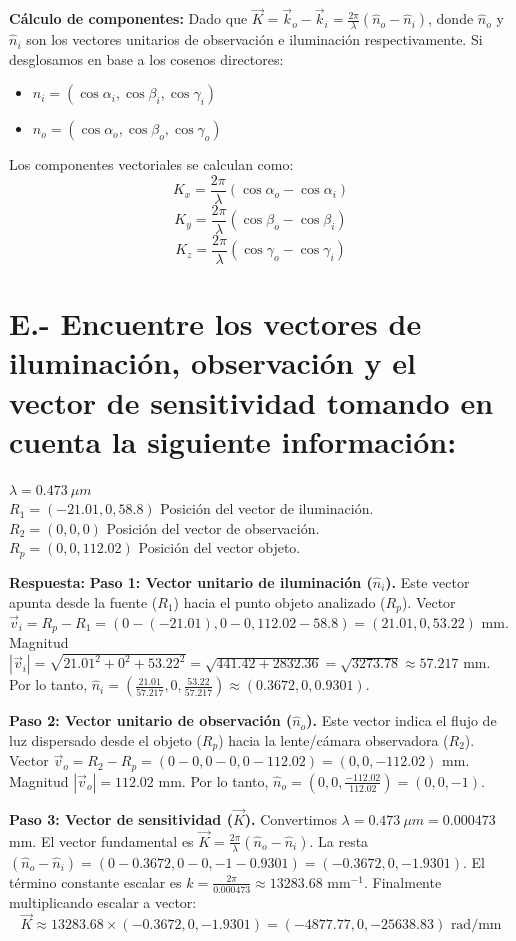 \documentclass[12pt,letterpaper]{article}
\begin{document}
	\textbf{Cálculo de componentes:}
	Dado que $\vec{K} = \vec{k}_o - \vec{k}_i = \frac{2\pi}{\lambda}(\hat{n}_o - \hat{n}_i)$, donde $\hat{n}_o$ y $\hat{n}_i$ son los vectores unitarios de observación e iluminación respectivamente. Si desglosamos en base a los cosenos directores:
	\begin{itemize}
		\item $\hat{n}_i = (\cos\alpha_i, \cos\beta_i, \cos\gamma_i)$
		\item $\hat{n}_o = (\cos\alpha_o, \cos\beta_o, \cos\gamma_o)$
	\end{itemize}
	Los componentes vectoriales se calculan como:
	\[
	K_x = \frac{2\pi}{\lambda} (\cos\alpha_o - \cos\alpha_i)
	\]
	\[
	K_y = \frac{2\pi}{\lambda} (\cos\beta_o - \cos\beta_i)
	\]
	\[
	K_z = \frac{2\pi}{\lambda} (\cos\gamma_o - \cos\gamma_i)
	\]
	
	\newpage
	\section*{E.- Encuentre los vectores de iluminación, observación y el vector de sensitividad tomando en cuenta la siguiente información:}
		$\lambda = 0.473~\mu m$\\
		$R_1 = (-21.01, 0, 58.8)$ Posición del vector de iluminación.\\
		$R_2 = (0, 0, 0)$ Posición del vector de observación.\\
		$R_p = (0, 0, 112.02)$ Posición del vector objeto.
	
	\textbf{Respuesta:}
	\textbf{Paso 1: Vector unitario de iluminación ($\hat{n}_i$).}
	Este vector apunta desde la fuente ($R_1$) hacia el punto objeto analizado ($R_p$).
	Vector $\vec{v}_i = R_p - R_1 = (0 - (-21.01), 0 - 0, 112.02 - 58.8) = (21.01, 0, 53.22)$ mm.
	Magnitud $|\vec{v}_i| = \sqrt{21.01^2 + 0^2 + 53.22^2} = \sqrt{441.42 + 2832.36} = \sqrt{3273.78} \approx 57.217$ mm.
	Por lo tanto, $\hat{n}_i = \left(\frac{21.01}{57.217}, 0, \frac{53.22}{57.217}\right) \approx (0.3672, 0, 0.9301)$.
	
	\textbf{Paso 2: Vector unitario de observación ($\hat{n}_o$).}
	Este vector indica el flujo de luz dispersado desde el objeto ($R_p$) hacia la lente/cámara observadora ($R_2$).
	Vector $\vec{v}_o = R_2 - R_p = (0 - 0, 0 - 0, 0 - 112.02) = (0, 0, -112.02)$ mm.
	Magnitud $|\vec{v}_o| = 112.02$ mm.
	Por lo tanto, $\hat{n}_o = \left(0, 0, \frac{-112.02}{112.02}\right) = (0, 0, -1)$.
	
	\textbf{Paso 3: Vector de sensitividad ($\vec{K}$).}
	Convertimos $\lambda = 0.473~\mu m = 0.000473~$mm.
	El vector fundamental es $\vec{K} = \frac{2\pi}{\lambda} (\hat{n}_o - \hat{n}_i)$.
	La resta $(\hat{n}_o - \hat{n}_i) = (0 - 0.3672, 0 - 0, -1 - 0.9301) = (-0.3672, 0, -1.9301)$.
	El término constante escalar es $k = \frac{2\pi}{0.000473} \approx 13283.68 \text{ mm}^{-1}$.
	Finalmente multiplicando escalar a vector:
	\[
	\vec{K} \approx 13283.68 \times (-0.3672, 0, -1.9301) = (-4877.77, 0, -25638.83) \text{ rad/mm}
	\]
	
\end{document}
